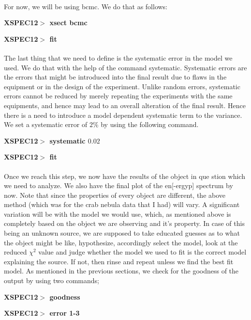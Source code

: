 \documentclass[a4paper,twoside]{report}
\numberwithin{equation}{section}
\begin{document}
\paragraph{}
For now, we will be using bcmc. We do that as follows:
\begin{center}
\item \large \textbf{XSPEC12$>$ xsect bcmc}
\item \large \textbf{XSPEC12$>$ fit}
\end{center}
\paragraph{}
The last thing that we need to define is the systematic error in the model we used. We do that with the help of the command systematic. Systematic errors are the errors that might be introduced into the final result due to flaws in the equipment or in the design of the experiment. Unlike random errors, systematic errors cannot be reduced by merely repeating the experiments with the same equipments, and hence may lead to an overall alteration of the final result. Hence there is a need to introduce a model dependent systematic term to the variance. We set a systematic error of $2$\% by using the following command. 
\begin{center}
\item \large \textbf{XSPEC12$>$ systematic $0.02$}
\item \large \textbf{XSPEC12$>$ fit}
\end{center}
\paragraph{}
Once we reach this step, we now have the results of the object in que
\;stion which we need to analyze. We also have the final plot of the en[-ergyp] spectrum by now. Note that since the properties of every object are different, the above method (which was for the crab nebula data that I had) will vary. A significant variation will be with the model we would use, which, as mentioned above is completely based on the object we are observing and it's property. In case of this being an unknown source, we are supposed to take educated guesses as to what the object might be like, hypothesize, accordingly select the model, look at the reduced $\chi ^2$ value and judge whether the model we used to fit is the correct model explaining the source. If not, then rinse and repeat unless we find the best fit model. As mentioned in the previous sections, we check for the goodness of the output by using two commands;
\begin{center}
\item \large \textbf{XSPEC12$>$ goodness}
\item \large \textbf{XSPEC12$>$ error 1-3}
\end{center}
\end{document}
